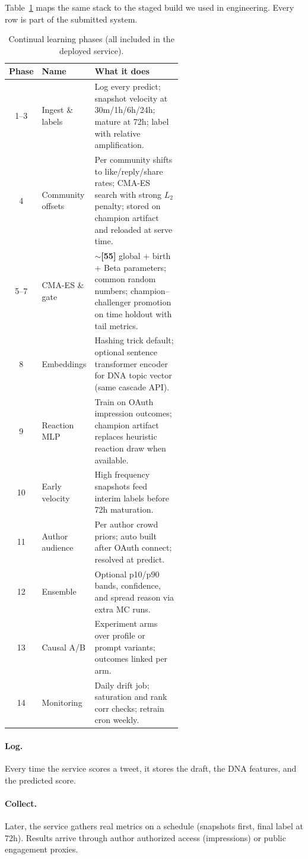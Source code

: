 \documentclass[11pt]{article}
\newcommand{\fill}[1]{\textbf{[#1]}}
\begin{document}
Table~\ref{tab:phases} maps the same stack to the staged build we used in
engineering. Every row is part of the submitted system.

\begin{table}[t]
\centering
\caption{Continual learning phases (all included in the deployed service).}
\label{tab:phases}
\small
\begin{tabular}{clp{0.58\linewidth}}
\toprule
Phase & Name & What it does \\
\midrule
1--3 & Ingest \& labels &
Log every predict; snapshot velocity at 30m/1h/6h/24h; mature at 72h;
label with relative amplification. \\
4 & Community offsets &
Per community shifts to like/reply/share rates; CMA-ES search with strong
$L_2$ penalty; stored on champion artifact and reloaded at serve time. \\
5--7 & CMA-ES \& gate &
$\sim$\fill{55} global + birth + Beta parameters; common random numbers;
champion--challenger promotion on time holdout with tail metrics. \\
8 & Embeddings &
Hashing trick default; optional sentence transformer encoder for DNA topic
vector (same cascade API). \\
9 & Reaction MLP &
Train on OAuth impression outcomes; champion artifact replaces heuristic
reaction draw when available. \\
10 & Early velocity &
High frequency snapshots feed interim labels before 72h maturation. \\
11 & Author audience &
Per author crowd priors; auto built after OAuth connect; resolved at predict. \\
12 & Ensemble &
Optional p10/p90 bands, confidence, and spread reason via extra MC runs. \\
13 & Causal A/B &
Experiment arms over profile or prompt variants; outcomes linked per arm. \\
14 & Monitoring &
Daily drift job; saturation and rank corr checks; retrain cron weekly. \\
\bottomrule
\end{tabular}
\end{table}

\paragraph{Log.}
Every time the service scores a tweet, it stores the draft, the DNA features, and
the predicted score.

\paragraph{Collect.}
Later, the service gathers real metrics on a schedule (snapshots first, final
label at 72h). Results arrive through author authorized access (impressions) or
public engagement proxies.
\end{document}
